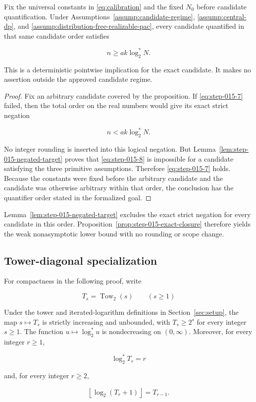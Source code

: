 \begin{proposition}\label{prop:step-015-exact-closure}
Fix the universal constants in \eqref{eq:calibration} and the fixed
\(N_0\) before
candidate quantification. Under Assumptions~\ref{assump:candidate-regime},
\ref{assump:central-dp}, and
\ref{assump:distribution-free-realizable-pac}, every candidate quantified
in that same candidate order satisfies

\[
n\ge a k\log_2^*N.
\tag{S15.7}\label{eq:step-015-7}
\]

This is a deterministic pointwise implication for the exact candidate. It
makes no assertion outside the approved candidate regime.
\end{proposition}

\begin{proof}
Fix an arbitrary candidate covered by the proposition. If \eqref{eq:step-015-7} failed, then
the total order on the real numbers would give its exact strict negation

\[
n<ak\log_2^*N.
\tag{S15.8}\label{eq:step-015-8}
\]

No integer rounding is inserted into this logical negation. But
Lemma~\ref{lem:step-015-negated-target} proves that \eqref{eq:step-015-8} is impossible for a
candidate satisfying the three primitive assumptions. Therefore \eqref{eq:step-015-7} holds.
Because the constants were fixed before the arbitrary candidate and the
candidate was otherwise arbitrary within that order, the conclusion has the
quantifier order stated in the formalized goal. \end{proof}
Lemma~\ref{lem:step-015-negated-target} excludes the exact strict negation
for every candidate in this order.  Proposition~\ref{prop:step-015-exact-closure}
therefore yields the weak nonasymptotic lower bound with no rounding or
scope change.

\subsection{Tower-diagonal specialization}\label{app:step-016}
For compactness in the following proof, write

\[
T_s=\operatorname{Tow}_2(s)\qquad(s\ge1)
\]

\begin{lemma}\label{lem:step-016-tower-arithmetic}
Under the tower and iterated-logarithm definitions in
Section~\ref{sec:setup}, the map
\(s\mapsto T_s\) is strictly increasing and unbounded, with
\(T_s\ge2^s\) for every integer \(s\ge1\). The function
\(u\mapsto\log_2^*u\) is nondecreasing on \((0,\infty)\). Moreover, for
every integer \(r\ge1\),

\[
\log_2^*T_r=r
\tag{S16.1}\label{eq:step-016-1}
\]

and, for every integer \(r\ge2\),

\[
\left\lfloor\log_2(T_r+1)\right\rfloor=T_{r-1}.
\tag{S16.2}\label{eq:step-016-2}
\]
\end{lemma}

